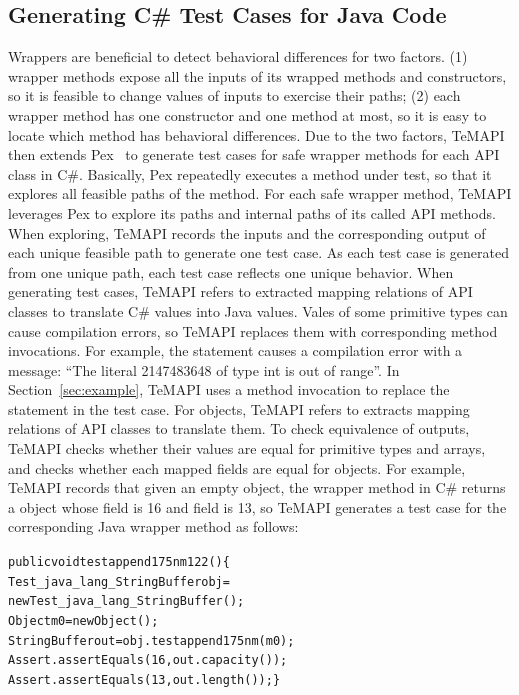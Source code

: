 \subsection{Generating C\# Test Cases for Java Code}
\label{sec:approach:single}
Wrappers are beneficial to detect behavioral differences for two factors. (1) wrapper methods expose all the inputs of its wrapped methods and constructors, so it is feasible to change values of inputs to exercise their paths; (2) each wrapper method has one constructor and one method at most, so it is easy to locate which method has behavioral differences. Due to the two factors, TeMAPI then extends Pex~\cite{tillmann2008pex} to generate test cases for safe wrapper methods for each API class in C\#. Basically, Pex repeatedly executes a method under test, so that it explores all feasible paths of the method. For each safe wrapper method, TeMAPI leverages Pex to explore its paths and internal paths of its called API methods. When exploring, TeMAPI records the inputs and the corresponding output of each unique feasible path to generate one test case. As each test case is generated from one unique path, each test case reflects one unique behavior. When generating test cases, TeMAPI refers to extracted mapping relations of API classes to translate C\# values into Java values. Vales of some primitive types can cause compilation errors, so TeMAPI replaces them with corresponding method invocations. For example, the  statement causes a compilation error with a message: ``The literal 2147483648 of type int is out of range''. In Section~\ref{sec:example}, TeMAPI uses a method invocation to replace the statement in the  test case. For objects, TeMAPI refers to extracts mapping relations of API classes to translate them. To check equivalence of outputs, TeMAPI checks whether their values are equal for primitive types and arrays, and checks whether each mapped fields are equal for objects. For example, TeMAPI records that given an empty object, the  wrapper method in C\# returns a  object whose  field is 16 and  field is 13, so TeMAPI generates a test case for the corresponding Java wrapper method as follows:

\begin{CodeOut}\vspace*{-1ex}
\begin{alltt}
public void testappend175nm122()\{
  Test_java_lang_StringBuffer obj =
      new Test_java_lang_StringBuffer();
  Object m0 = new Object();
  StringBuffer out = obj.testappend175nm(m0);
  Assert.assertEquals(16, out.capacity());	
  Assert.assertEquals(13, out.length());\}
\end{alltt}
\end{CodeOut}\vspace*{-2ex}

